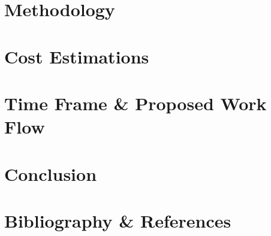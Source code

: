 \documentclass{article}
\begin{document}
\section{Methodology}
\section{Cost Estimations}
\section{Time Frame \& Proposed Work Flow}
\section{Conclusion}
\section{Bibliography \& References}
\end{document}
